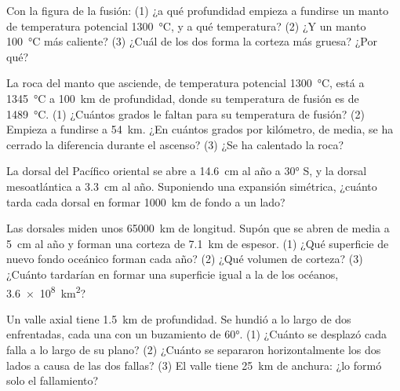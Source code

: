 \begin{exercise}[$\star\star$]\label{exo:g11:ocean-ridges:6}
Con la figura de la fusión: (1) ¿a qué profundidad empieza a fundirse un manto
de temperatura potencial \qty{1300}{\celsius}, y a qué temperatura? (2) ¿Y un
manto \qty{100}{\celsius} más caliente? (3) ¿Cuál de los dos forma la corteza
más gruesa? ¿Por qué?
\end{exercise}

\begin{exercise}[$\star\star$]\label{exo:g11:ocean-ridges:7}
La roca del manto que asciende, de temperatura potencial \qty{1300}{\celsius},
está a \qty{1345}{\celsius} a \qty{100}{km} de profundidad, donde su
temperatura de fusión es de \qty{1489}{\celsius}. (1) ¿Cuántos grados le faltan
para su temperatura de fusión? (2) Empieza a fundirse a \qty{54}{km}. ¿En
cuántos grados por kilómetro, de media, se ha cerrado la diferencia durante el
ascenso? (3) ¿Se ha calentado la roca?
\end{exercise}

\begin{exercise}[$\star\star$]\label{exo:g11:ocean-ridges:8}
La dorsal del Pacífico oriental se abre a \qty{14.6}{cm} al año a \ang{30} S,
y la dorsal mesoatlántica a \qty{3.3}{cm} al año. Suponiendo una expansión
simétrica, ¿cuánto tarda cada dorsal en formar \qty{1000}{km} de fondo a un
lado?
\end{exercise}

\begin{exercise}[$\star\star$]\label{exo:g11:ocean-ridges:9}
Las dorsales miden unos \qty{65000}{km} de longitud. Supón que se abren de
media a \qty{5}{cm} al año y forman una corteza de \qty{7.1}{km} de espesor.
(1) ¿Qué superficie de nuevo fondo oceánico forman cada año? (2) ¿Qué volumen
de corteza? (3) ¿Cuánto tardarían en formar una superficie igual a la de los
océanos, \qty{3.6e8}{km^2}?
\end{exercise}

\begin{exercise}[$\star\star$]\label{exo:g11:ocean-ridges:10}
Un valle axial tiene \qty{1.5}{km} de profundidad. Se hundió a lo largo de dos
 enfrentadas, cada una con un buzamiento de \ang{60}. (1) ¿Cuánto
se desplazó cada falla a lo largo de su plano? (2) ¿Cuánto se separaron
horizontalmente los dos lados a causa de las dos fallas? (3) El valle tiene
\qty{25}{km} de anchura: ¿lo formó solo el fallamiento?
\end{exercise}

